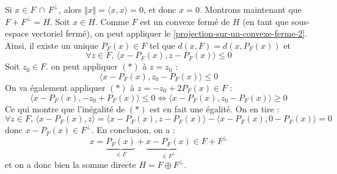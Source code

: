 	\begin{demonstration}
		Si $x \in F \, \cap \, F^\perp$, alors $\Vert x \Vert = \langle x, x \rangle = 0$, et donc $x = 0$. Montrons maintenant que $F + F^\perp = H$. Soit $x \in H$. Comme $F$ est un convexe fermé de $H$ (en tant que sous-espace vectoriel fermé), on peut appliquer le \cref{projection-sur-un-convexe-ferme-2}. Ainsi, il existe un unique $P_F(x) \in F$ tel que $d(x, F) = d(x, P_F(x))$ et
		\[ \forall z \in F, \, \langle x - P_F(x), z - P_F(x) \rangle \leq 0 \tag{$*$} \]
		Soit $z_0 \in F$. on peut appliquer $(*)$ à $z = z_0$ :
		\[ \langle x - P_F(x), z_0 - P_F(x) \rangle \leq 0 \]
		On va également appliquer $(*)$ à $z = -z_0 + 2P_F(x) \in F$ :
		\[ \langle x - P_F(x), -z_0 + P_F(x) \rangle \leq 0 \iff \langle x - P_F(x), z_0 - P_F(x) \rangle \geq 0 \]
		Ce qui montre que l'inégalité de $(*)$ est en fait une égalité. On en tire :
		\[ \forall z \in F, \, \langle x - P_F(x), z \rangle = \langle x - P_F(x), z - P_F(x) \rangle - \langle x - P_F(x), 0 - P_F(x) \rangle = 0 \]
		donc $x - P_F(x) \in F^\perp$. En conclusion, on a :
		\[ x = \underbrace{P_F(x)}_{\in F} + \underbrace{x - P_F(x)}_{\in F^\perp} \in F + F^\perp \]
		et on a donc bien la somme directe $H = F \oplus F^\perp$.
	\end{demonstration}

